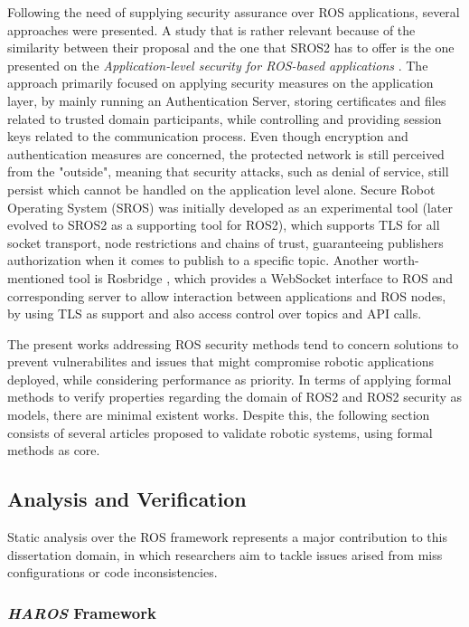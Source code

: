 Following the need of supplying security assurance over ROS applications, several approaches were presented. A study that is rather relevant because of the similarity between their proposal and the one that SROS2 has to offer is the one presented on the \textit{Application-level security for ROS-based applications} \cite{application-security-ros}. The approach primarily focused on applying security measures on the application layer, by mainly running an Authentication Server, storing certificates and files related to trusted domain participants, while controlling and providing session keys related to the communication process. Even though encryption and authentication measures are concerned, the protected network is still perceived from the "outside", meaning that security attacks, such as denial of service, still persist which cannot be handled on the application level alone. Secure Robot Operating System (SROS) \cite{white2016sros} was initially developed as an experimental tool (later evolved to SROS2 as a supporting tool for ROS2), which supports TLS for all socket transport, node restrictions and chains of trust, guaranteeing publishers authorization when it comes to publish to a specific topic. Another worth-mentioned tool is Rosbridge \cite{crick2017rosbridge}, which provides a WebSocket interface to ROS and corresponding server to allow interaction between applications and ROS nodes, by using TLS as support and also access control over topics and API calls. 

The present works addressing ROS security methods tend to concern solutions to prevent vulnerabilites and issues that might compromise robotic applications deployed, while considering performance as priority. In terms of applying formal methods to verify properties regarding the domain of ROS2 and ROS2 security as models, there are minimal existent works. Despite this, the following section consists of several articles proposed to validate robotic systems, using formal methods as core.

\subsection{Analysis and Verification}\label{s:relWork-pv}

Static analysis over the ROS framework represents a major contribution to this dissertation domain, in which researchers aim to tackle issues arised from miss configurations or code inconsistencies. 

\subsubsection{\textit{HAROS} Framework}

